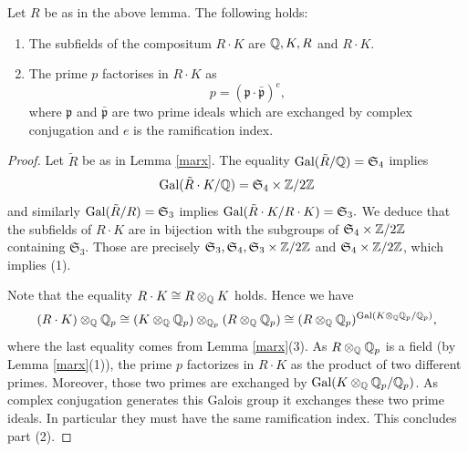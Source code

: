 \documentclass[11pt]{amsart}
\begin{document}
\begin{appendices}
\begin{lemma}\label{lenin}
Let $R$ be as in the above lemma. The following holds:
\begin{enumerate}
\item  The subfields of the compositum $R\cdot K$ are $\mathbb{Q},K,R$ and $R\cdot K$.
\item The prime $p$ factorises in $R\cdot K$ as 
\[p=(\mathfrak{p}\cdot \bar{\mathfrak{p}})^e,\]
where $\mathfrak{p}$ and $\bar{\mathfrak{p}}$ are  two prime ideals which are exchanged by  complex conjugation and $e$ is  the ramification index.
\end{enumerate}
\end{lemma}
\begin{proof}
Let $\tilde{R}$ be as in Lemma \ref{marx}. The equality $\textnormal{Gal}(\tilde{R}/\mathbb{Q})=\mathfrak{S}_4$ implies
\[\textnormal{Gal}(\tilde{R}\cdot K/\mathbb{Q})=\mathfrak{S}_4\times \mathbb{Z}/2\mathbb{Z}\]
and similarly $\textnormal{Gal}(\tilde{R}/R)=\mathfrak{S}_3$ implies $\textnormal{Gal}(\tilde{R}\cdot K/R \cdot K)=\mathfrak{S}_3.$
We deduce that the subfields of $R\cdot K$ are in bijection with the subgroups of $\mathfrak{S}_4\times \mathbb{Z}/2\mathbb{Z}$ containing $\mathfrak{S}_3$. Those are precisely $\mathfrak{S}_3 , \mathfrak{S}_4, \mathfrak{S}_3\times \mathbb{Z}/2\mathbb{Z}$ and $\mathfrak{S}_4\times \mathbb{Z}/2\mathbb{Z}$, which implies (1).

Note that  the equality $R\cdot K \cong R \otimes_{\mathbb{Q}} K$ holds. Hence we have
\[(R\cdot K) \otimes_{\mathbb{Q}} \mathbb{Q}_p \cong  (K \otimes_{\mathbb{Q}} \mathbb{Q}_p) \otimes_{\mathbb{Q}_p} (R \otimes_{\mathbb{Q}} \mathbb{Q}_p) \cong (R \otimes_{\mathbb{Q}} \mathbb{Q}_p)^{\textnormal{Gal}(K \otimes_{\mathbb{Q}} \mathbb{Q}_p/\mathbb{Q}_p) }, \]
where the last equality comes from  Lemma \ref{marx}(3). As ${R \otimes_{\mathbb{Q}} \mathbb{Q}_p}$ is a field (by Lemma \ref{marx}(1)), the prime $p$ factorizes in $R\cdot K$ as the product of two different primes. Moreover, those two primes are exchanged by $\textnormal{Gal}(K \otimes_{\mathbb{Q}} \mathbb{Q}_p/\mathbb{Q}_p)$. As complex conjugation generates this Galois group it exchanges these two prime ideals. In particular they must have the same ramification index. This concludes part (2).
\end{proof}


\end{appendices}
\end{document}
